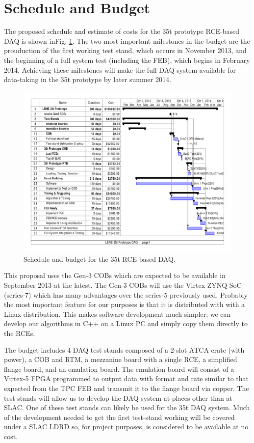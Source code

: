 \section{Schedule and Budget}

The proposed schedule and estimate of costs for the 35t prototype RCE-based DAQ is shown inFig. \ref{fig:budget35t}.  
The two most important milestones in the budget are the prouduction of the first
working test stand, which occurs in November 2013, and the beginning of a full
system test (including the FEB), which begins in February 2014. 
Achieving these milestones will make the full DAQ system available for data-taking
in the 35t prototype by later summer 2014.


\begin{figure}[htb]
\includegraphics[scale=0.8,angle=90]{project-gantt.pdf}
\caption{Schedule and budget for the 35t RCE-based DAQ.}
\label{fig:budget35t}
\end{figure} 

This proposal uses the Gen-3 COBs which are expected to be available in September 
2013 at the latest.  The Gen-3 COBs will use the Virtex ZYNQ SoC (series-7) which has many advantages over the series-5 previously used.  Probably the most important feature for our purposes is that it is distributed with with a Linux distribution.  This makes software development much simpler; we can develop our algorithms in C++ on a Linux PC and simply copy them directly to the RCEs.  

The budget includes 4 DAQ test stands composed of a 2-slot ATCA crate (with power), a COB and RTM, a mezzanine board with a single RCE, a simplified flange board, and an emulation board.  The emulation board will consist of a Virtex-5 FPGA programmed to output data with format and rate  similar to that expected from the TPC FEB and transmit it to the flange board via copper.  The test stands will allow us to develop the DAQ system at places other than at SLAC.  One of these test stands can likely be used for the 35t DAQ system.    Much of the development needed to get the first test-stand working will be covered under a SLAC LDRD so, for project purposes, is considered to be available at no cost.  

